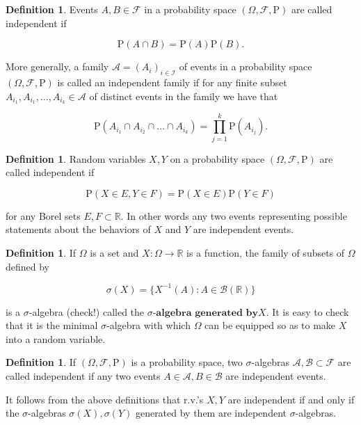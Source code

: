 \documentclass[11pt]{report}
\providecommand{\cal}{\mathcal}
\newcommand{\R}{\mathbb{R}}
\theoremstyle{plain}
\theoremstyle{definition}
\newtheorem{defn}[thm]{Definition}
\begin{document}
\begin{defn}
Events $A, B \in {\cal F}$ in a probability space
$(\Omega, {\cal F}, \mathrm{P})$ are called
independent if

\[
\mathrm{P}(A\cap B) = \mathrm{P}(A)\mathrm{P}(B).
\]

More generally, a family
${\cal A}=(A_i)_{i\in {\cal I}}$ of events in a
probability space $(\Omega, {\cal F}, \mathrm{P})$ is
called an independent family if for any finite subset
$A_{i_1}, A_{i_1}, \ldots, A_{i_k} \in {\cal A}$ of
distinct events in the family we have that

\[
\mathrm{P}(A_{i_1} \cap A_{i_2} \cap \ldots \cap A_{i_k}) = \prod_{j=1}^k \mathrm{P}(A_{i_j}).
\]

\end{defn}

\begin{defn}
Random variables $X, Y$ on a probability space
$(\Omega, {\cal F}, \mathrm{P})$ are called
independent if

\[
\mathrm{P}(X \in E, Y \in F) = \mathrm{P}(X\in E)\mathrm{P}(Y\in F)
\]

for any Borel sets $E,F \subset \R$. In other words
any two events representing possible statements about
the behaviors of $X$ and $Y$ are independent events.
\end{defn}

\begin{defn}
If $\Omega$ is a set and $X:\Omega\to\R$ is a
function, the family of subsets of $\Omega$ defined
by

\[
\sigma(X) = \Big\{ X^{-1}(A) : A \in {\cal B}(\R) \Big\}
\]

is a $\sigma$-algebra (check!) called the
$\textbf{$\sigma$-algebra generated by$X$}$. It is
easy to check that it is the minimal $\sigma$-algebra
with which $\Omega$ can be equipped so as to make $X$
into a random variable.
\end{defn}

\begin{defn}
If $(\Omega, {\cal F}, \mathrm{P})$ is a probability
space, two $\sigma$-algebras
${\cal A}, {\cal B}\subset {\cal F}$ are called
independent if any two events
$A\in {\cal A}, B\in{\cal B}$ are independent events.
\end{defn}

It follows from the above definitions that r.v.'s
$X,Y$ are independent if and only if the
$\sigma$-algebras $\sigma(X), \sigma(Y)$ generated by
them are independent $\sigma$-algebras.
\end{document}
